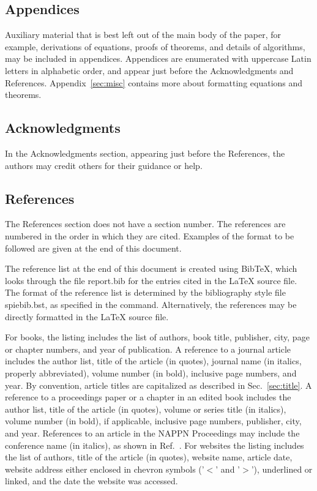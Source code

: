 \documentclass[]{spie}  %
\begin{document}
\subsection{Appendices}
Auxiliary material that is best left out of the main body of the paper, for example, derivations of equations, proofs of theorems, and details of algorithms, may be included in appendices.  Appendices are enumerated with uppercase Latin letters in alphabetic order, and appear just before the Acknowledgments and References. Appendix~\ref{sec:misc} contains more about formatting equations and theorems.

\subsection{Acknowledgments}
In the Acknowledgments section, appearing just before the References, the authors may credit others for their guidance or help.  

\subsection{References}
The References section does not have a section number.  The references are numbered in the order in which they are cited.  Examples of the format to be followed are given at the end of this document.  

The reference list at the end of this document is created using BibTeX, which looks through the file {\ttfamily report.bib} for the entries cited in the LaTeX source file.  The format of the reference list is determined by the bibliography style file {\ttfamily spiebib.bst}, as specified in the \verb|| command.  Alternatively, the references may be directly formatted in the LaTeX source file.

For books\cite{Lamport94,Alred03,Goossens97}, the listing includes the list of authors, book title, publisher, city, page or chapter numbers, and year of publication.  A reference to a journal article\cite{Metropolis53} includes the author list, title of the article (in quotes), journal name (in italics, properly abbreviated), volume number (in bold), inclusive page numbers, and year.  By convention\cite{Lamport94}, article titles are capitalized as described in Sec.~\ref{sec:title}.  A reference to a proceedings paper or a chapter in an edited book\cite{Gull89a} includes the author list, title of the article (in quotes), volume or series title (in italics), volume number (in bold), if applicable, inclusive page numbers, publisher, city, and year.  References to an article in the NAPPN Proceedings may include the conference name (in italics), as shown in Ref.~. For websites\cite{Lees-Miller-LaTeX-course-1} the listing includes the list of authors, title of the article (in quotes), website name, article date, website address either enclosed in chevron symbols ('\(<\)' and '\(>\)'),  underlined or linked, and the date the website was accessed. 
\end{document}
